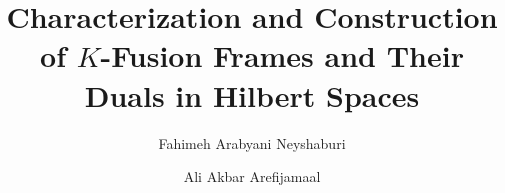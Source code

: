 \documentclass{birkjour}
\theoremstyle{definition}
\theoremstyle{remark}
\numberwithin{equation}{section}
\begin{document}
%
%
%
%
%
%
%
%
%


\title[$K$-Fusion Frames]
 {Characterization and Construction of $K$-Fusion Frames and Their Duals  in Hilbert Spaces}

















\author[F. Arabyani Neyshaburi]{Fahimeh Arabyani Neyshaburi}
\address{Department of Mathematics and Computer Sciences, Hakim Sabzevari University, Sabzevar, Iran.}

\author[A.  Arefijamaal]{Ali Akbar Arefijamaal}
\address{Department of Mathematics and Computer Sciences, Hakim Sabzevari University, Sabzevar, Iran.}


















\end{document}

